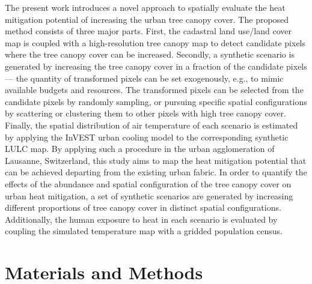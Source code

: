\documentclass[10pt,letterpaper]{article}
\begin{document}
The present work introduces a novel approach to spatially evaluate the heat mitigation potential of increasing the urban tree canopy cover. The proposed method consists of three major parts.
First, the cadastral land use/land cover map is coupled with a high-resolution tree canopy map to detect candidate pixels where the tree canopy cover can be increased.
Secondly, a synthetic scenario is generated by increasing the tree canopy cover in a fraction of the candidate pixels --- the quantity of transformed pixels can be set exogenously, e.g., to mimic available budgets and resources.
The transformed pixels can be selected from the candidate pixels by randomly sampling, or pursuing specific spatial configurations by scattering or clustering them to other pixels with high tree canopy cover.
Finally, the spatial distribution of air temperature of each scenario is estimated by applying the InVEST urban cooling model to the corresponding synthetic LULC map.
By applying such a procedure in the urban agglomeration of Lausanne, Switzerland, this study aims to map the heat mitigation potential that can be achieved departing from the existing urban fabric.
In order to quantify the effects of the abundance and spatial configuration of the tree canopy cover on urban heat mitigation, a set of synthetic scenarios are generated by increasing different proportions of tree canopy cover in distinct spatial configurations. %
Additionally, the human exposure to heat in each scenario is evaluated by coupling the simulated temperature map with a gridded population census.


\section*{Materials and Methods}
\end{document}

